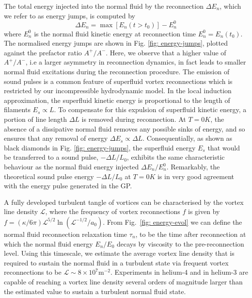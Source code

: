 \documentclass[%
 reprint,
 amsmath,amssymb,
 aps,
 prl,
]{revtex4-2}
\begin{document}
The total energy injected into the normal fluid by the reconnection $\Delta E_n$, which we refer to as energy jumps, is computed by 
\begin{equation}
	\Delta E_n = \max{\left[E_n(t>t_0)\right]} - E_n^0
\end{equation} 
where $E_n^0$ is the normal fluid kinetic energy at reconnection time $E_n^0=E_n(t_0)$. The normalised energy jumps are shown in Fig. \ref{fig: energy-jumps}, plotted against the prefactor ratio $A^+/A^-$. Here, we observe that a higher value of $A^+/A^-$, i.e a larger asymmetry in reconnection dynamics, in fact leads to smaller normal fluid excitations during the reconnection procedure. The emission of sound pulses is a common feature of superfluid vortex reconnections \cite{leadbeaterSoundEmissionDue2001b} which is restricted by our incompressible hydrodynamic model. In the local induction approximation, the superfluid kinetic energy is proportional to the length of filaments $E_s\propto L$. To compensate for this expulsion of superfluid kinetic energy, a portion of line length $\Delta L$ is removed during reconnection. At $T=0K$, the absence of a dissipative normal fluid removes any possible sinks of energy, and so ensures that any removal of energy $\Delta E_s\propto \Delta L$. Consequentially, as shown as black diamonds in Fig. \ref{fig: energy-jumps}, the superfluid energy $E_s$ that would be transferred to a sound pulse, $-\Delta L/L_0$, exhibits the same characteristic behaviour as the normal fluid energy injected $\Delta E_n/E_n^0$. Remarkably, the theoretical sound pulse energy $-\Delta L/L_0$ at $T=0K$ is in very good agreement with the energy pulse generated in the GP.


A fully developed turbulent tangle of vortices \cite{barenghi2004} can be characterised by the vortex line density $\mathcal{L}$, where the frequency of vortex reconnections $f$ is given by ${f=(\kappa/6\pi)\mathcal{L}^{5/2}\ln(\mathcal{L}^{-1/2}/a_0)}$. From Fig.~\ref{fig: energy-evol} we can define the normal fluid reconnection relaxation time $\tau_n$, to be the time after reconnection at which the normal fluid energy $E_n/E_0$ decays by viscosity to the pre-reconnection level. Using this timescale, we estimate the average vortex line density that is required to sustain the normal fluid in a turbulent state via frequent vortex reconnections to be $\mathcal{L}\sim 8\times10^{7}\mathrm{m}^{-2}$. Experiments in helium-4 \cite{schwarz1981,milliken1982,roche2008,roche2007} and in helium-3 \cite{bradley2006} are capable of reaching a vortex line density several orders of magnitude larger than the estimated value to sustain a turbulent normal fluid state.
\end{document}
